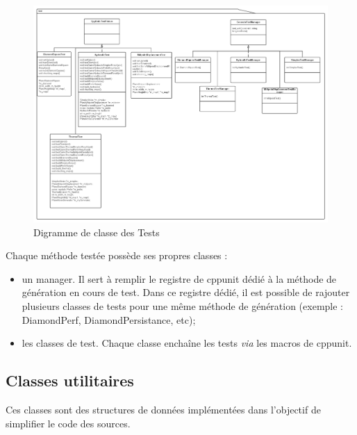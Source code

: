 \begin{figure}
  \includegraphics[width=20cm]{resources/Test_package_v2.png}
        \caption{Digramme de classe des Tests}
        \label{fig:class-diagram-test}
\end{figure}

Chaque méthode testée possède ses propres classes :
\begin{itemize}
 \item un manager. Il sert à remplir le registre de cppunit dédié à la méthode de génération en cours de test.
 Dans ce registre dédié, il est possible de rajouter plusieurs classes de tests pour une même méthode de génération 
  (exemple : DiamondPerf, DiamondPersistance, etc);
 \item les classes de test. Chaque classe enchaîne les tests \textit{via} les macros de cppunit.
\end{itemize}

\subsection{Classes utilitaires}
Ces classes sont des structures de données implémentées dans l'objectif de simplifier le code des 
sources.



